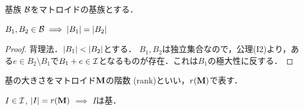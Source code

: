 \documentclass[14pt,aspectratio=169,xcolor=dvipsnames,table,onlytextwidth,dvipdfmx]{beamer}
\begin{document}
\begin{frame}{基族}
    \bigskip
    $\mathcal{B}$をマトロイドの基族とする．
    \begin{lemma}
        $B_1, B_2 \in \mathcal{B} \implies \lvert B_1\rvert = \lvert B_2\rvert$
    \end{lemma}
    \pause
    {\small 
    \begin{proof}
    背理法．$\lvert B_1\rvert < \lvert B_2\rvert$とする．
    $B_1, B_2$は独立集合なので，公理(I2)より，ある$e \in B_2 \setminus B_1$で$B_1 + e \in \mathcal{I}$となるものが存在．これは$B_1$の極大性に反する．
    \end{proof}
    }

    \pause
    \bigskip
    基の大きさをマトロイド$\mathbf{M}$の\alert{階数 (rank)}といい，$r(\mathbf{M})$で表す．
    \begin{lemma}
        $I \in \mathcal{I}$, $\lvert I\rvert = r(\mathbf{M})$ $\implies$ $I$は基．
    \end{lemma}
\end{frame}
\end{document}
